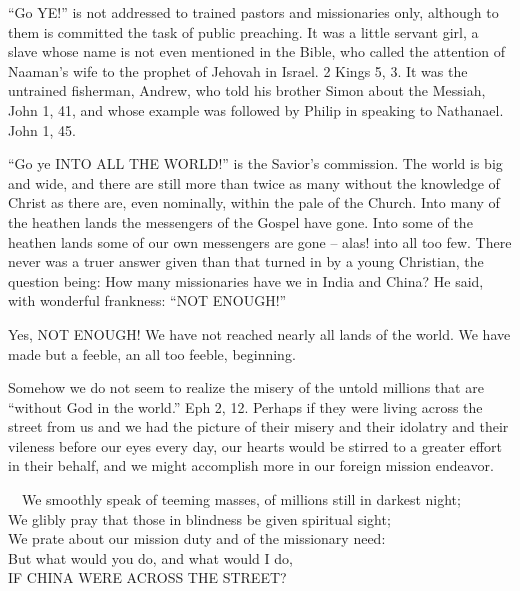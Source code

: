 \documentclass[
]{book}
\begin{document}
``Go YE!'' is not addressed to trained pastors and missionaries only, although to them is committed the task of public preaching. It was a little servant girl, a slave whose name is not even mentioned in the Bible, who called the attention of Naaman's wife to the prophet of Jehovah in Israel. 2 Kings 5, 3. It was the untrained fisherman, Andrew, who told his brother Simon about the Messiah, John 1, 41, and whose example was followed by Philip in speaking to Nathanael. John 1, 45.

``Go ye INTO ALL THE WORLD!'' is the Savior's commission. The world is big and wide, and there are still more than twice as many without the knowledge of Christ as there are, even nominally, within the pale of the Church. Into many of the heathen lands the messengers of the Gospel have gone. Into some of the heathen lands some of our own messengers are gone -- alas! into all too few. There never was a truer answer given than that turned in by a young Christian, the question being: How many missionaries have we in India and China? He said, with wonderful frankness: ``NOT ENOUGH!''

Yes, NOT ENOUGH! We have not reached nearly all lands of the world. We have made but a feeble, an all too feeble, beginning.

Somehow we do not seem to realize the misery of the untold millions that are ``without God in the world.'' Eph 2, 12. Perhaps if they were living across the street from us and we had the picture of their misery and their idolatry and their vileness before our eyes every day, our hearts would be stirred to a greater effort in their behalf, and we might accomplish more in our foreign mission endeavor.

~~We smoothly speak of teeming masses, of millions still in darkest night;\\
\hspace*{0.333em}\hspace*{0.333em}We glibly pray that those in blindness be given spiritual sight;\\
\hspace*{0.333em}\hspace*{0.333em}We prate about our mission duty and of the missionary need:\\
\hspace*{0.333em}\hspace*{0.333em}But what would you do, and what would I do,\\
\hspace*{0.333em}\hspace*{0.333em}IF CHINA WERE ACROSS THE STREET?
\end{document}
